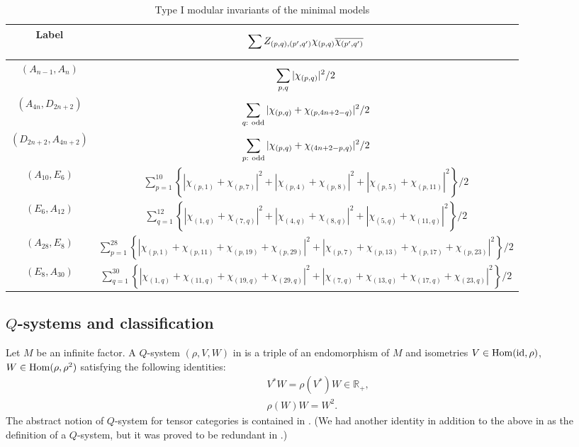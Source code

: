 \documentclass[12pt]{article}
\def\Hom{{\rm Hom}}
\def\id{{\rm id}}
\def\R{{\mathbb R}}
\begin{document}
\begin{table}[htbp]
\begin{center}{\footnotesize
\begin{tabular}{|c|c|}\hline
Label & $\displaystyle\sum_{\vphantom{x}}^{\vphantom{x}}
Z_{(p,q),(p',q')} \chi_{(p,q)} \overline{\chi_{(p',q')}}$
\\ \hline
$(A_{n-1},A_n)$ & $\displaystyle\sum_{p,q}^{\vphantom{x}}
|\chi_{(p,q)}|^2/2$
\\ \hline
$(A_{4n},D_{2n+2})$
& $\displaystyle\sum_{q:{\rm\ odd}}^{\vphantom{x}}
|\chi_{(p,q)}+\chi_{(p,4n+2-q)}|^2/2$
\\ \hline
$(D_{2n+2},A_{4n+2})$ &
$\displaystyle\sum_{p:{\rm\ odd}}^{\vphantom{x}}
|\chi_{(p,q)}+\chi_{(4n+2-p,q)}|^2/2$
\\ \hline
$(A_{10},E_6)$ & 
$\displaystyle\sum_{p=1}^{10} \left\{|\chi_{(p,1)}+\chi_{(p,7)}|^2+
|\chi_{(p,4)}+\chi_{(p,8)}|^2+|\chi_{(p,5)}+\chi_{(p,11)}|^2\right\}/2$
\\ \hline
$(E_6, A_{12})$ &
$\displaystyle\sum_{q=1}^{12} \left\{|\chi_{(1,q)}+\chi_{(7,q)}|^2+
|\chi_{(4,q)}+\chi_{(8,q)}|^2+|\chi_{(5,q)}+\chi_{(11,q)}|^2\right\}/2$
\\ \hline
$(A_{28},E_8)$ &
$\displaystyle\sum_{p=1}^{28} \left\{|\chi_{(p,1)}+\chi_{(p,11)}+
\chi_{(p,19)}+\chi_{(p,29)}|^2+|\chi_{(p,7)}+\chi_{(p,13)}+
\chi_{(p,17)}+\chi_{(p,23)}|^2\right\}/2$
\\ \hline
$(E_8, A_{30})$ &
$\displaystyle\sum_{q=1}^{30} \left\{|\chi_{(1,q)}+\chi_{(11,q)}+
\chi_{(19,q)}+\chi_{(29,q)}|^2+|\chi_{(7,q)}+\chi_{(13,q)}+
\chi_{(17,q)}+\chi_{(23,q)}|^2\right\}/2$
\\ \hline
\end{tabular}
\caption{Type I modular invariants of the minimal models}
\label{Vir-mod-I}
}\end{center}
\end{table}

\subsection{$Q$-systems and classification}
\label{Q-syst}

Let $M$ be an infinite factor. 
A $Q$-system $(\rho, V, W)$ in \cite{L2} is a triple of an
endomorphism of $M$ and isometries $V\in\Hom(\id,\rho)$,
$W\in\Hom(\rho,\rho^2)$ satisfying the following identities:
\begin{eqnarray*}
&&V^* W =\rho(V^*)W \in\R_+,\\
&&\rho(W)W=W^2.
\end{eqnarray*}
The abstract notion of $Q$-system for tensor categories is contained 
in \cite{LRo}. (We had another identity in addition to the above
in \cite{L2} as the definition of a
$Q$-system, but it was proved to be redundant in \cite{LRo}.)
\end{document}
